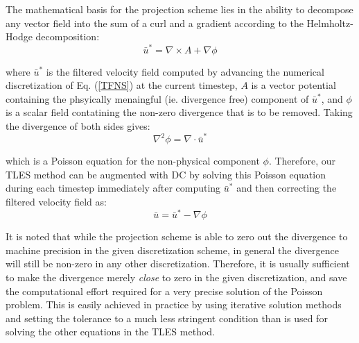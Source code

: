 The mathematical basis for the projection scheme lies in the ability to decompose any vector field into the sum of a curl and a gradient according to the Helmholtz-Hodge decomposition:
\begin{equation}
\bar{u}^*=\nabla\times A+\nabla\phi
\end{equation}

where $\bar{u}^*$ is the filtered velocity field computed by advancing the numerical discretization of Eq. (\ref{TFNS}) at the current timestep, $A$ is a vector potential containing the phsyically menaingful (ie. divergence free) component of $\bar{u}^*$, and $\phi$ is a scalar field contatining the non-zero divergence that is to be removed. Taking the divergence of both sides gives:
\begin{equation} \label{eq:poisson}
\nabla^2 \phi=\nabla\cdot\bar{u}^*
\end{equation}

which is a Poisson equation for the non-physical component $\phi$. Therefore, our TLES method can be augmented with DC by solving this Poisson equation during each timestep immediately after computing $\bar{u}^*$ and then correcting the filtered velocity field as:
\begin{equation}
\bar{u}=\bar{u}^*-\nabla\phi
\end{equation}

It is noted that while the projection scheme is able to zero out the divergence to machine precision in the given discretization scheme, in general the divergence will still be non-zero in any other discretization. Therefore, it is usually sufficient to make the divergence merely \emph{close} to zero in the given discretization, and save the computational effort required for a very precise solution of the Poisson problem. This is easily achieved in practice by using iterative solution methods and setting the tolerance to a much less stringent condition than is used for solving the other equations in the TLES method.
